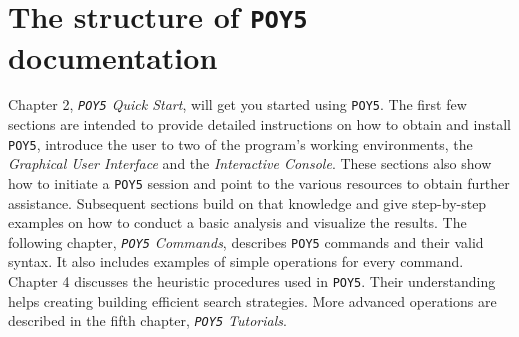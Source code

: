 \documentclass[11pt]{book}
\newcommand{\commandstyle}[1]{\texttt{#1}}
\newcommand{\poy}{\commandstyle{POY5}\xspace}
\begin{document}
\section{The structure of \poy documentation}
Chapter 2, \emph{\poy Quick Start}, will get you started using \poy. The first few sections are intended to provide detailed 
instructions on how to obtain and install \poy, introduce the user to two of the program's working environments, the 
\emph{Graphical User Interface} and the \emph{Interactive Console}. These sections also show how to initiate a \poy 
session and point to the various resources to obtain further assistance. Subsequent sections build on that knowledge and 
give step-by-step examples on how to conduct a basic analysis and visualize the results. The following chapter, 
\emph{\poy Commands}, describes \poy commands and their valid syntax. It also includes examples of simple operations 
for every command. Chapter 4 discusses the heuristic procedures used in \poy. Their understanding helps creating building 
efficient search strategies. More advanced operations are described in the fifth chapter, \emph{\poy Tutorials}. 
\end{document}
